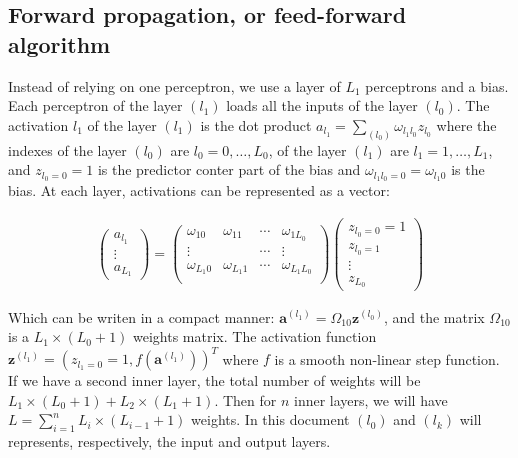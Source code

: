 \documentclass[final, paper=letter,5p,times,twocolumn]{elsarticle}
\begin{document}
\subsection{Forward propagation, or feed-forward algorithm}
Instead of relying on one perceptron, we use a layer of $L_{1}$ perceptrons and a bias. Each perceptron of the layer $(l_{1})$ loads all the inputs of the layer $(l_{0})$. The activation $l_{1}$ of the layer $(l_{1})$ is the dot product $a_{l_{1}} = \sum_{(l_{0})} \omega_{l_{1}l_{0}}z_{l_{0}}$ where the indexes of the layer $(l_{0})$ are $l_{0} = 0, \dots, L_{0}$, of the layer $(l_{1})$ are $l_{1} = 1, \dots, L_{1}$, and $z_{l_{0} = 0} = 1$ is the predictor conter part of the bias and $\omega_{l_{1}l_{0} = 0} = \omega_{l_{1}0}$ is the bias. At each layer, activations can be represented as a vector:

\begin{eqnarray*}
  \left(
  \begin{array}{c}
    a_{l_{1}} \\
    \vdots \\
    a_{L_{1}}
  \end{array}
  \right) = \left(
  \begin{array}{cccc}
    \omega_{10} & \omega_{11} & \cdots & \omega_{1L_{0}} \\
    \vdots     &            & \cdots & \vdots \\
    \omega_{L_{1}0} & \omega_{L_{1}1} & \cdots & \omega_{L_{1}L_{0}} \\
  \end{array}
  \right)  \left(
  \begin{array}{c}
    z_{l_{0} = 0} = 1 \\
    z_{l_{0} = 1} \\
    \vdots \\
    z_{L_{0}} 
  \end{array}
  \right)
\end{eqnarray*}

Which can be writen in a compact manner: $\bm{a}^{(l_{1})} = \Omega_{10}\bm{z}^{(l_{0})}$, and the matrix $\Omega_{10}$ is a $L_{1}\times(L_{0}+1)$ weights matrix. The activation function $\bm{z}^{(l_{1})} = (z_{l_{1} = 0} = 1, f(\bm{a}^{(l_{1})}))^{T}$ where $f$ is a smooth non-linear step function. If we have a second inner layer, the total number of weights will be $L_{1}\times(L_{0}+1) + L_{2}\times(L_{1}+1)$. Then for $n$ inner layers, we will have $L = \sum_{i = 1}^{n}L_{i}\times(L_{i-1}+1)$ weights. In this document $(l_{0})$ and $(l_{k})$ will represents, respectively, the input and output layers.
\end{document}
